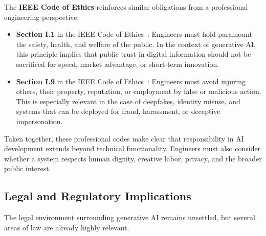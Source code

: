 The \textbf{IEEE Code of Ethics} reinforces similar obligations from a professional engineering perspective:
\begin{itemize}
    \item \textbf{Section I.1} in the IEEE Code of Ethics~\cite{ieee}: Engineers must hold paramount the safety, health, and welfare of the public. In the context of generative AI, this principle implies that public trust in digital information should not be sacrificed for speed, market advantage, or short-term innovation.

    \item \textbf{Section I.9} in the IEEE Code of Ethics~\cite{ieee}: Engineers must avoid injuring others, their property, reputation, or employment by false or malicious action. This is especially relevant in the case of deepfakes, identity misuse, and systems that can be deployed for fraud, harassment, or deceptive impersonation.
\end{itemize}

Taken together, these professional codes make clear that responsibility in AI development extends beyond technical functionality. Engineers must also consider whether a system respects human dignity, creative labor, privacy, and the broader public interest.

\subsection{Legal and Regulatory Implications}\label{sec:legal}

The legal environment surrounding generative AI remains unsettled, but several areas of law are already highly relevant.


